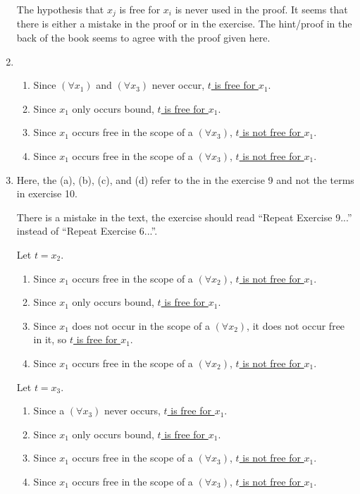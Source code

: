 \begin{enumerate}
    \note{} The hypothesis that \(x_j\) is free for \(x_i\) is never used in the proof. It seems that there is either a mistake in the proof or in the exercise. The hint/proof in the back of the book seems to agree with the proof given here.

  \item %
    \begin{enumerate}[label = (\alph*), align = left]
      \item Since \((\forall x_1)\) and \((\forall x_3)\) never occur, \underline{\(t\) is free for \(x_1\)}.
      \item Since \(x_1\) only occurs bound, \underline{\(t\) is free for \(x_1\)}.
      \item Since \(x_1\) occurs free in the scope of a \((\forall x_3)\), \underline{\(t\) is not free for \(x_1\)}.
      \item Since \(x_1\) occurs free in the scope of a \((\forall x_3)\), \underline{\(t\) is not free for \(x_1\)}.
    \end{enumerate}

  \item %
    Here, the (a), (b), (c), and (d) refer to the \wfs{} in the exercise 9 and not the terms in exercise 10.

    \note{} There is a mistake in the text, the exercise should read ``Repeat Exercise 9...'' instead of ``Repeat Exercise 6...''.

    Let \(t = x_2\).
    \begin{enumerate}[label = (\alph*), align = left]
      \item Since \(x_1\) occurs free in the scope of a \((\forall x_2)\), \underline{\(t\) is not free for \(x_1\)}.
      \item Since \(x_1\) only occurs bound, \underline{\(t\) is free for \(x_1\)}.
      \item Since \(x_1\) does not occur in the scope of a \((\forall x_2)\), it does not occur free in it, so \underline{\(t\) is free for \(x_1\)}.
      \item Since \(x_1\) occurs free in the scope of a \((\forall x_2)\), \underline{\(t\) is not free for \(x_1\)}.
    \end{enumerate}

    Let \(t = x_3\).
    \begin{enumerate}[label = (\alph*), align = left]
      \item Since a \((\forall x_3)\) never occurs, \underline{\(t\) is free for \(x_1\)}.
      \item Since \(x_1\) only occurs bound, \underline{\(t\) is free for \(x_1\)}.
      \item Since \(x_1\) occurs free in the scope of a \((\forall x_3)\), \underline{\(t\) is not free for \(x_1\)}.
      \item Since \(x_1\) occurs free in the scope of a \((\forall x_3)\), \underline{\(t\) is not free for \(x_1\)}.
    \end{enumerate}


\end{enumerate}
